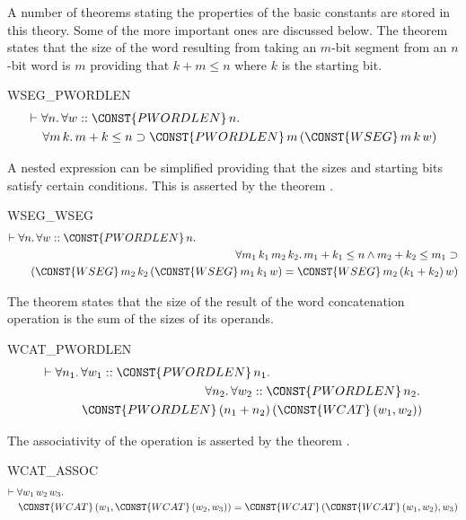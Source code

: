 A number of theorems stating the properties of the basic constants are
stored in this theory. Some of the more important ones are discussed below.
The theorem  states that the size of the
word resulting from taking an $m$-bit segment from an $n$-bit word is $m$
providing that $k + m \leq n$ where $k$ is the starting bit.
\begin{holthm}{WSEG_PWORDLEN}
\begin{eqnarray*}
\lefteqn{\THM \FORALL n\DOT \FORALL w ::\CONST{PWORDLEN} \,n\DOT} \\
 & & {}\FORALL m \,k\DOT m + k \LEE  n \IMP
           \CONST{PWORDLEN} \,m \,(\CONST{WSEG} \,m \,k \,w)
\end{eqnarray*}
\end{holthm}
A nested  expression can be simplified providing that the
sizes and starting bits satisfy certain conditions. This is asserted
by the theorem .
\begin{holthm}{WSEG_WSEG}
\begin{eqnarray*}
\lefteqn{\THM \FORALL n\DOT \FORALL w ::\CONST{PWORDLEN} \,n\DOT} \\
 & & {}\FORALL m_{1} \,k_{1} \,m_{2} \,k_{2}\DOT
                     m_{1} + k_{1} \LEE  n \AND
                     m_{2} + k_{2} \LEE  m_{1} \IMP  \\
 & & \quad (\CONST{WSEG} \,m_{2} \,k_{2}
                            \,(\CONST{WSEG} \,m_{1} \,k_{1} \,w) =
                            \CONST{WSEG} \,m_{2} \,(k_{1} + k_{2})
                               \,w)
\end{eqnarray*}
\end{holthm}
The theorem  states that the size of the result
of the word concatenation operation is the sum of the sizes of its
operands.
\begin{holthm}{WCAT_PWORDLEN}
\begin{eqnarray*}
\lefteqn{\THM \FORALL n_{1}\DOT \FORALL w_1 :: \CONST{PWORDLEN} \,n_{1}\DOT}\\
 & & \quad \FORALL n_{2}\DOT \FORALL w_2 :: \CONST{PWORDLEN} \,n_{2}\DOT \\
 & & \qquad \CONST{PWORDLEN} \,(n_{1} + n_{2})
                                 \,(\CONST{WCAT} \,(w_{1},w_{2}))
\end{eqnarray*}
\end{holthm}
The associativity of the  operation  is asserted by the
theorem .
\begin{holthm}{WCAT_ASSOC}
\begin{eqnarray*}
\lefteqn{\THM \FORALL w_{1} \,w_{2} \,w_{3}\DOT} \\
 & &        \CONST{WCAT} \,(w_{1},\CONST{WCAT} \,(w_{2},w_{3})) =
           \CONST{WCAT} \,(\CONST{WCAT} \,(w_{1},w_{2}),w_{3})
\end{eqnarray*}
\end{holthm}
